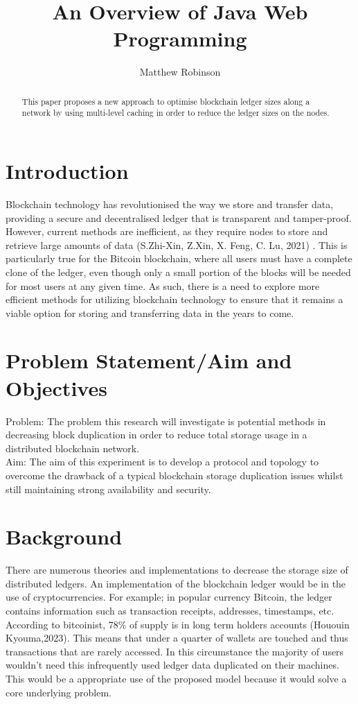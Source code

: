 \documentclass{article}
\title{An Overview of Java Web Programming}
\author{Matthew Robinson}
\begin{document}
\begin{CJK}{UTF8}{gbsn}
\maketitle

\begin{abstract}
This paper proposes a new approach to optimise blockchain ledger sizes along a network by using multi-level caching in order to reduce the ledger sizes on the nodes.
\end{abstract}

\tableofcontents
\listoffigures

\section{Introduction}
Blockchain technology has revolutionised the way we store and transfer data, providing a secure and decentralised ledger that is transparent and tamper-proof. However, current methods are inefficient, as they require nodes to store and retrieve large amounts of data (S.Zhi-Xin, Z.Xin, X. Feng, C. Lu, 2021) . This is particularly true for the Bitcoin blockchain, where all users must have a complete clone of the ledger, even though only a small portion of the blocks will be needed for most users at any given time. As such, there is a need to explore more efficient methods for utilizing blockchain technology to ensure that it remains a viable option for storing and transferring data in the years to come.

\section{Problem Statement/Aim and Objectives}

Problem: The problem this research will investigate is potential methods in decreasing block duplication in order to reduce total storage usage in a distributed blockchain network.\\

Aim: The aim of this experiment is to develop a protocol and topology to overcome the drawback of a typical blockchain storage duplication issues whilst still maintaining strong availability and security.


\section{Background}

There are numerous theories and implementations to decrease the storage size of distributed ledgers. An implementation of the blockchain ledger would be in the use of cryptocurrencies. For example; in popular currency Bitcoin, the ledger contains information such as transaction receipts, addresses, timestamps, etc. According to bitcoinist, 78\% of supply is in long term holders accounts (Hououin Kyouma,2023). This means that under a quarter of wallets are touched and thus transactions that are rarely accessed. In this circumstance the majority of users wouldn’t need this infrequently used ledger data duplicated on their machines. This would be a appropriate use of the proposed model because it would solve a core underlying problem.


\end{CJK}
\end{document}
